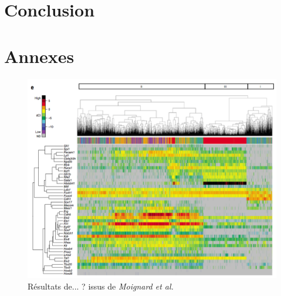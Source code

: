 \documentclass[fleqn,11pt]{SelfArx} %
\providecommand\phantomsection{}
\begin{document}



\section*{Conclusion}



\newpage
\phantomsection



\newpage
\section*{Annexes}

\begin{figure}[ht]
\centering
\includegraphics[width=\linewidth]{images/article2}
\caption{Résultats de... ? issus de \textit{Moignard et al.}}
\label{fig:artcile2}
\end{figure}
\end{document}
